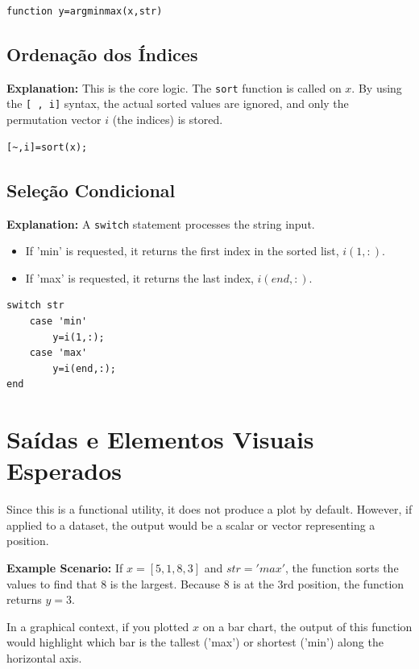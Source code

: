 \begin{lstlisting}
function y=argminmax(x,str)
\end{lstlisting}

\subsection{Ordenação dos Índices}
\textbf{Explanation:} This is the core logic. The \texttt{sort} function is called on $x$. By using the \texttt{[~, i]} syntax, the actual sorted values are ignored, and only the permutation vector $i$ (the indices) is stored.

\begin{lstlisting}
[~,i]=sort(x);
\end{lstlisting}

\subsection{Seleção Condicional}
\textbf{Explanation:} A \texttt{switch} statement processes the string input. 
\begin{itemize}
    \item If 'min' is requested, it returns the first index in the sorted list, $i(1,:)$.
    \item If 'max' is requested, it returns the last index, $i(end,:)$.
\end{itemize}

\begin{lstlisting}
switch str
    case 'min'
        y=i(1,:);
    case 'max'
        y=i(end,:);
end
\end{lstlisting}

\section{Saídas e Elementos Visuais Esperados}
Since this is a functional utility, it does not produce a plot by default. However, if applied to a dataset, the output would be a scalar or vector representing a position.

\textbf{Example Scenario:}
If $x = [5, 1, 8, 3]$ and $str = 'max'$, the function sorts the values to find that $8$ is the largest. Because $8$ is at the 3rd position, the function returns $y = 3$. 

In a graphical context, if you plotted $x$ on a bar chart, the output of this function would highlight which bar is the tallest ('max') or shortest ('min') along the horizontal axis.
